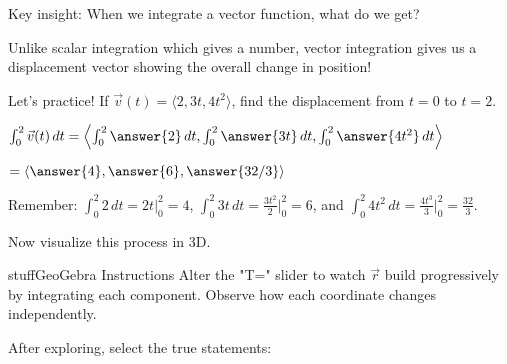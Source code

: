\documentclass{ximera}
\begin{document}
\begin{problem}
Key insight: When we integrate a vector function, what do we get?

\begin{multipleChoice}
\end{multipleChoice}

\begin{feedback}
Unlike scalar integration which gives a number, vector integration gives us a displacement vector showing the overall change in position!
\end{feedback}
\end{problem}

\begin{problem}
Let's practice! If $\vec{v}(t) = \langle 2, 3t, 4t^2 \rangle$, find the displacement from $t=0$ to $t=2$.

$\int_0^2 \vec{v}(t) \, dt = \left\langle \int_0^2 \answer{2} \, dt, \int_0^2 \answer{3t} \, dt, \int_0^2 \answer{4t^2} \, dt \right\rangle$

$= \langle \answer{4}, \answer{6}, \answer{32/3} \rangle$

\begin{feedback}
Remember: $\int_0^2 2 \, dt = 2t \big|_0^2 = 4$, $\int_0^2 3t \, dt = \frac{3t^2}{2} \big|_0^2 = 6$, and $\int_0^2 4t^2 \, dt = \frac{4t^3}{3} \big|_0^2 = \frac{32}{3}$.
\end{feedback}
\end{problem}

\begin{problem}
Now visualize this process in 3D.

\begin{expandable}{stuff}{GeoGebra Instructions}
    Alter the "T=" slider to watch $\vec{r}$ build progressively by integrating each component. Observe how each coordinate changes independently.
\end{expandable}

\begin{center}
\end{center}

After exploring, select the true statements:
\begin{selectAll}
\end{selectAll}
\end{problem}
\end{document}
